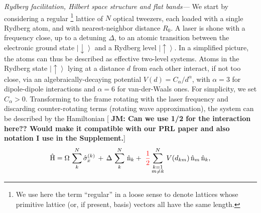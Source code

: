 \documentclass[prl,aps,twocolumn,showpacs,superscriptaddress,longbibliography]{revtex4-1}
\newcommand{\ran}{\right\rangle}
\newcommand{\ket}[1]{\left| #1 \ran}
\newcommand{\up}{\uparrow}
\newcommand{\down}{\downarrow}
\newcommand{\op}[1]{\mathrm{\hat{#1}}}
\begin{document}
\emph{Rydberg facilitation, Hilbert space structure and flat bands---} We start by considering a regular \footnote{We use here the term ``regular'' in a loose sense to denote lattices whose primitive lattice (or, if present, basis) vectors all have the same length.} lattice of $N$ optical tweezers, each loaded with a single Rydberg atom, and with nearest-neighbor distance $R_0$. A laser is shone with a frequency close, up to a detuning $\Delta$, to an atomic transition between the electronic ground state $\ket{\down}$ and a Rydberg level $\ket{\up}$. In a simplified picture, the atoms can thus be described as effective two-level systems. Atoms in the Rydberg state $\ket{\up}$ lying at a distance $d$ from each other interact, if not too close, via an algebraically-decaying potential $V(d) = C_\alpha / d^\alpha$, with $\alpha = 3$ for dipole-dipole interactions and $\alpha = 6$ for van-der-Waals ones. For simplicity, we set $C_\alpha > 0$. Transforming to the frame rotating with the laser frequency and discarding counter-rotating terms (rotating wave approximation), the system can be described by the Hamiltonian [{\color{red} \bf JM: Can we use 1/2 for the interaction here?? Would make it compatible with our PRL paper and also notation I use in the Supplement.}]
%
\begin{align}
 \op{H} = \Omega \, \sum_k^N  \op{\sigma}_x^{(k)} \, + \, \Delta\, \sum_k^N\,\op{n}_k +\,  \,
{\color{red} \frac{1}{2}} \sum_{\substack{k= 1\\ m \ne k}}^N \, V(d_{km}) \, \op{n}_m\, \op{n}_k,
 \label{Eq:Hamil_full}
\end{align}
%
\end{document}
